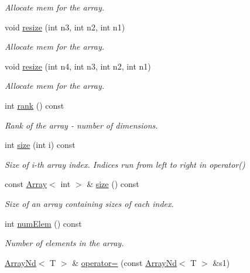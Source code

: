 \begin{DoxyCompactItemize}
\begin{DoxyCompactList}\small\item\em Allocate mem for the array. \end{DoxyCompactList}\item 
void \mbox{\hyperlink{classADAT_1_1ArrayNd_a1b042ead88dae6696d7a0c77fd01ddfa}{resize}} (int n3, int n2, int n1)
\begin{DoxyCompactList}\small\item\em Allocate mem for the array. \end{DoxyCompactList}\item 
void \mbox{\hyperlink{classADAT_1_1ArrayNd_a2a54d490a8a0a7aa9aeeaee6e6a84b90}{resize}} (int n4, int n3, int n2, int n1)
\begin{DoxyCompactList}\small\item\em Allocate mem for the array. \end{DoxyCompactList}\item 
int \mbox{\hyperlink{classADAT_1_1ArrayNd_a3f681a80aee7e76cc959431f45d931f8}{rank}} () const
\begin{DoxyCompactList}\small\item\em Rank of the array -\/ number of dimensions. \end{DoxyCompactList}\item 
int \mbox{\hyperlink{classADAT_1_1ArrayNd_aa289b2d57b41dc1c61d061865e6cb912}{size}} (int i) const
\begin{DoxyCompactList}\small\item\em Size of i-\/th array index. Indices run from left to right in operator() \end{DoxyCompactList}\item 
const \mbox{\hyperlink{classXMLArray_1_1Array}{Array}}$<$ int $>$ \& \mbox{\hyperlink{classADAT_1_1ArrayNd_a81494e519c7c5fae6e7ef2e2b46ba24b}{size}} () const
\begin{DoxyCompactList}\small\item\em Size of an array containing sizes of each index. \end{DoxyCompactList}\item 
int \mbox{\hyperlink{classADAT_1_1ArrayNd_a5c33ae0e66b53a2fd86f804f0f4292e9}{num\+Elem}} () const
\begin{DoxyCompactList}\small\item\em Number of elements in the array. \end{DoxyCompactList}\item 
\mbox{\hyperlink{classADAT_1_1ArrayNd}{Array\+Nd}}$<$ T $>$ \& \mbox{\hyperlink{classADAT_1_1ArrayNd_ae3c6bdf408c630fc44a7c6dcdac94ae1}{operator=}} (const \mbox{\hyperlink{classADAT_1_1ArrayNd}{Array\+Nd}}$<$ T $>$ \&s1)

\end{DoxyCompactItemize}
